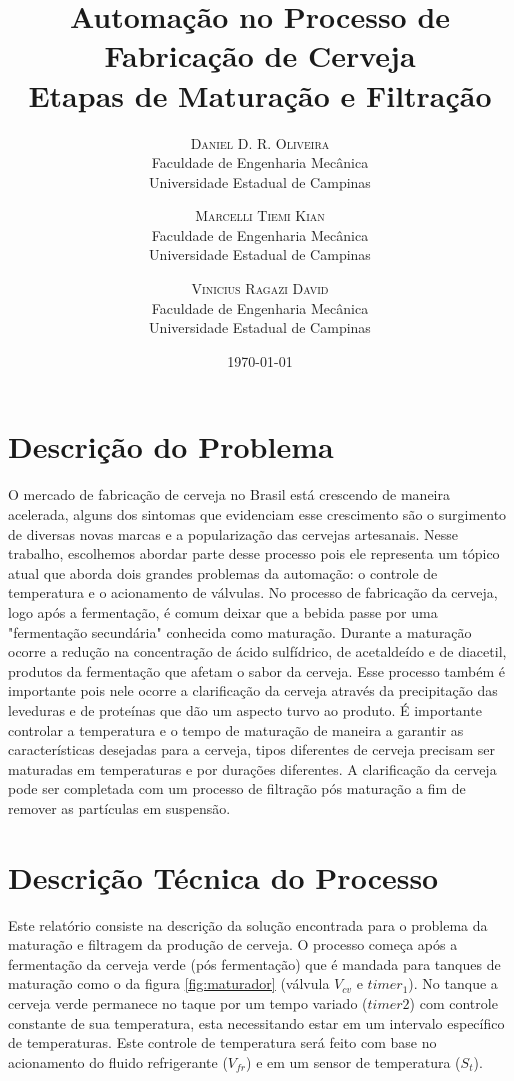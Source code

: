 \documentclass[twoside,twocolumn, 12pt]{paper}
\title{Automação no Processo de Fabricação de Cerveja\\ 
	\large Etapas de Maturação e Filtração} %
\author{%
	\textsc{Daniel D. R. Oliveira}\\[1ex]
	\normalsize Faculdade de Engenharia Mecânica\\
	\normalsize Universidade Estadual de Campinas\\
	\and
	\textsc{Marcelli Tiemi Kian}\\[1ex]
	\normalsize Faculdade de Engenharia Mecânica\\
	\normalsize Universidade Estadual de Campinas\\
	\and
	\textsc{Vinicius Ragazi David}\\[1ex]
	\normalsize Faculdade de Engenharia Mecânica\\
	\normalsize Universidade Estadual de Campinas\\
}
\date{\today} %
\begin{document}
	
	\maketitle
	
	\section{Descrição do Problema}
	O mercado de fabricação de cerveja no Brasil está crescendo de maneira acelerada, alguns dos sintomas que evidenciam esse crescimento são o surgimento de diversas novas marcas e a popularização das cervejas artesanais. Nesse trabalho, escolhemos abordar parte desse processo pois ele representa um tópico atual que aborda dois grandes problemas da automação: o controle de temperatura e o acionamento de válvulas.
	No processo de fabricação da cerveja, logo após a fermentação, é comum deixar que a bebida passe por uma "fermentação secundária" conhecida como maturação. Durante a maturação ocorre a redução na concentração de ácido sulfídrico, de acetaldeído e de diacetil, produtos da fermentação que afetam o sabor da cerveja. Esse processo também é importante pois nele ocorre a clarificação da cerveja através da precipitação das leveduras e de proteínas que dão um aspecto turvo ao produto. É importante controlar a temperatura e o tempo de maturação de maneira a garantir as características desejadas para a cerveja, tipos diferentes de cerveja precisam ser maturadas em temperaturas e por durações diferentes. A clarificação da cerveja pode ser completada com um processo de filtração pós maturação a fim de remover as partículas em suspensão.
	
	\section{Descrição Técnica do Processo}
	
	Este relatório consiste na descrição da solução encontrada para o problema da maturação e filtragem da produção de cerveja. O processo começa após a fermentação da cerveja verde (pós fermentação) que é mandada para tanques de maturação como o da figura \ref{fig:maturador} (válvula $V_{cv}$ e $timer_1$). No tanque a cerveja verde permanece no taque por um tempo variado ($timer2$) com controle constante de sua temperatura, esta necessitando estar em um intervalo específico de temperaturas. Este controle de temperatura será feito com base no acionamento do fluido refrigerante ($V_{fr}$) e em um sensor de temperatura ($S_t$).
	
\end{document}
